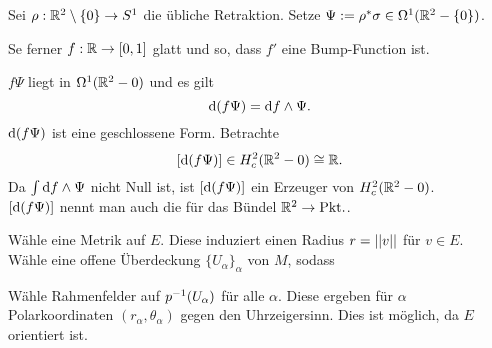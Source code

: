 Sei $\rho : \mathbb{R}^2 \setminus \{0\} \overset{}{\rightarrow} S^1$ die übliche Retraktion. Setze $\Psi := \rho^*\sigma \in \Omega^1(\mathbb{R}^2 - \{0\})$.

Se ferner $f : \mathbb{R} \overset{}{\rightarrow} [0,1] $ glatt und so, dass $f'$ eine Bump-Function ist.

$f\Psi$ liegt in $\Omega^1(\mathbb{R}^2 - 0)$ und es gilt
\[ \text{d}(f\Psi) = \text{d} f \wedge \Psi. \]
$\text{d}(f \Psi)$ ist eine geschlossene Form. Betrachte
\[ [\text{d} (f\Psi) ] \in H_c^2(\mathbb{R}^2 - 0) \overset{}{\cong} \mathbb{R}. \]
Da $\int \text{d} f \wedge \Psi$ nicht Null ist, ist $[\text{d} (f\Psi) ]$ ein Erzeuger von $H_c^2(\mathbb{R}^2 - 0) $.\\
$[\text{d} (f\Psi) ]$  nennt man auch die  für das Bündel $\mathbb{R}^2 \overset{}{\rightarrow} \mathrm{Pkt.}$.


Wähle eine Metrik auf $E$. Diese induziert einen Radius $r = \left|\left|v\right|\right|$ für $v \in E$.\\
Wähle eine offene Überdeckung $\{U_\alpha\}_\alpha$ von $M$, sodass 
\begin{center}
\end{center}
Wähle Rahmenfelder auf $p^{-1}(U_\alpha)$ für alle $\alpha$. Diese ergeben für $\alpha$ Polarkoordinaten  $(r_\alpha, \theta_\alpha)$ gegen den Uhrzeigersinn. Dies ist möglich, da $E$ orientiert ist.